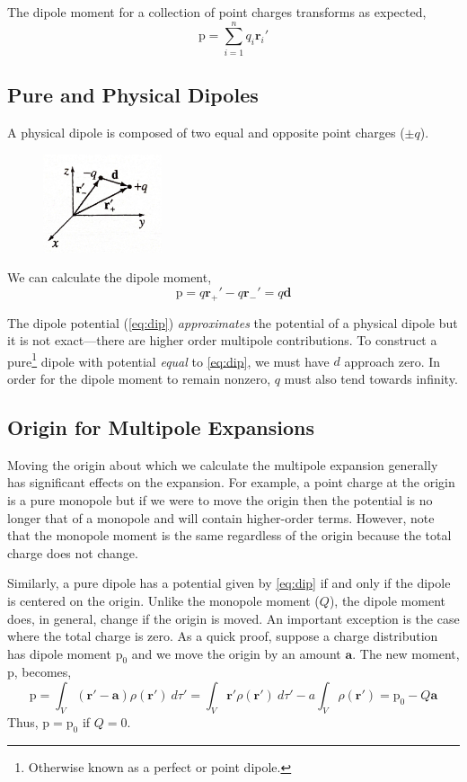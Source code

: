 \documentclass[12pt]{report}
\numberwithin{equation}{section}
\def\p{{\mbox{$\boldsymbol{\mathrm{p}}$}}}
\begin{document}
	The dipole moment for a collection of point charges transforms as expected,
	\begin{equation}
		\p = \sum_{i=1}^n q_i\boldsymbol{r}_i'
	\end{equation}
	
	\subsection{Pure and Physical Dipoles}
	A physical dipole is composed of two equal and opposite point charges ($ \pm q $).
	\begin{figure}[H]
		\centering
		\includegraphics[width=3.5cm] {img/dipole}
	\end{figure}
	We can calculate the dipole moment,
	\begin{equation}
		\p = q\boldsymbol{r}_+' - q\boldsymbol{r}_-' = q\boldsymbol{d}
	\end{equation}
	
	The dipole potential (\ref{eq:dip}) \textit{approximates} the potential of a physical dipole but it is not exact---there are higher order multipole contributions. To construct a pure\footnote{Otherwise known as a perfect or point dipole.} dipole with potential \textit{equal} to \ref{eq:dip}, we must have $ d $ approach zero. In order for the dipole moment to remain nonzero, $ q $ must also tend towards infinity.
	
	\subsection{Origin for Multipole Expansions}
	
	Moving the origin about which we calculate the multipole expansion generally has significant effects on the expansion. For example, a point charge at the origin is a pure monopole but if we were to move the origin then the potential is no longer that of a monopole and will contain higher-order terms. However, note that the monopole moment is the same regardless of the origin because the total charge does not change.
	
	Similarly, a pure dipole has a potential given by \ref{eq:dip} if and only if the dipole is centered on the origin. Unlike the monopole moment ($ Q $), the dipole moment does, in general, change if the origin is moved. An important exception is the case where the total charge is zero. As a quick proof, suppose a charge distribution has dipole moment $ \p_0 $ and we move the origin by an amount $ \boldsymbol{a} $. The new moment, $ \p $, becomes,
	\begin{equation}
		\p = \int_V (\boldsymbol{r}'-\boldsymbol{a})\rho(\boldsymbol{r}')\ d\tau' = \int_V \boldsymbol{r}'\rho(\boldsymbol{r}')\ d\tau' - a\int_V \rho(\boldsymbol{r}') = \p_0 - Q\boldsymbol{a}
	\end{equation}
	Thus, $ \p=\p_0 $ if $ Q=0 $.
	
\end{document}
